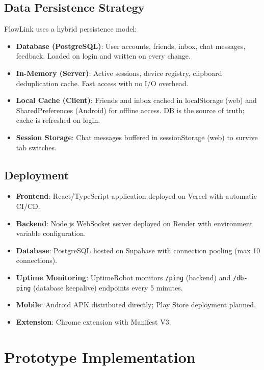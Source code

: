 \documentclass[conference]{IEEEtran}
\begin{document}
\subsection{Data Persistence Strategy}

FlowLink uses a hybrid persistence model:
\begin{itemize}
    \item \textbf{Database (PostgreSQL)}: User accounts, friends, inbox, chat messages, feedback. Loaded on login and written on every change.
    \item \textbf{In-Memory (Server)}: Active sessions, device registry, clipboard deduplication cache. Fast access with no I/O overhead.
    \item \textbf{Local Cache (Client)}: Friends and inbox cached in localStorage (web) and SharedPreferences (Android) for offline access. DB is the source of truth; cache is refreshed on login.
    \item \textbf{Session Storage}: Chat messages buffered in sessionStorage (web) to survive tab switches.
\end{itemize}

\subsection{Deployment}

\begin{itemize}
    \item \textbf{Frontend}: React/TypeScript application deployed on Vercel with automatic CI/CD.
    \item \textbf{Backend}: Node.js WebSocket server deployed on Render with environment variable configuration.
    \item \textbf{Database}: PostgreSQL hosted on Supabase with connection pooling (max 10 connections).
    \item \textbf{Uptime Monitoring}: UptimeRobot monitors \texttt{/ping} (backend) and \texttt{/db-ping} (database keepalive) endpoints every 5 minutes.
    \item \textbf{Mobile}: Android APK distributed directly; Play Store deployment planned.
    \item \textbf{Extension}: Chrome extension with Manifest V3.
\end{itemize}

\section{Prototype Implementation}
\end{document}
